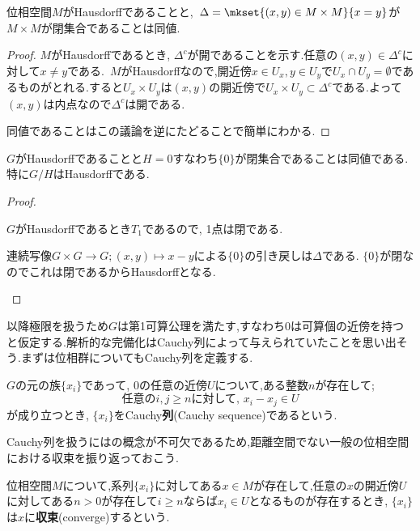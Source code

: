 \begin{prop}\label{prop:Hausdorffと対角線}
	位相空間$M$がHausdorffであることと,~$\Delta=\mkset{(x,y)\in M\times M}{x=y}$が$M\times M$が閉集合であることは同値.
\end{prop}
\begin{proof}
	$M$がHausdorffであるとき, $\Delta^c$が開であることを示す.任意の$(x,y)\in\Delta^c$に対して$x\neq y$である.~$M$がHausdorffなので,開近傍$x\in U_x,y\in U_y$で$U_x\cap U_y=\emptyset$であるものがとれる.すると$U_x\times U_y$は$(x,y)$の開近傍で$U_x\times U_y\subset\Delta^c$である.よって$(x,y)$は内点なので$\Delta^c$は開である.
	
	同値であることはこの議論を逆にたどることで簡単にわかる.
\end{proof}

\begin{prop}\label{prop:位相群がHdfになる条件}
	$G$がHausdorffであることと$H=0$すなわち$\{0\}$が閉集合であることは同値である.特に$G/H$はHausdorffである.
\end{prop}

\begin{proof}
	\begin{eqv}
		\item $G$がHausdorffであるとき$T_1$であるので, 1点は閉である.
		\item 連続写像$G\times G\to G;(x,y)\mapsto x-y$による$\{0\}$の引き戻しは$\Delta$である. $\{0\}$が閉なのでこれは閉であるからHausdorffとなる.
	\end{eqv}
\end{proof}

以降極限を扱うため$G$は第1可算公理を満たす,すなわち$0$は可算個の近傍を持つと仮定する.解析的な完備化はCauchy列によって与えられていたことを思い出そう.まずは位相群についてもCauchy列を定義する.

\begin{defi}[Cauchy列]
	$G$の元の族$\{x_i\}$であって, $0$の任意の近傍$U$について,ある整数$n$が存在して;
	\[\text{任意の}i,j\geq n\text{に対して, } x_i-x_j\in U\]
	が成り立つとき, $\{x_i\}$をCauchy\textbf{列}(Cauchy sequence)であるという.
\end{defi}

Cauchy列を扱うにはの概念が不可欠であるため,距離空間でない一般の位相空間における収束を振り返っておこう.

\begin{defi}[収束]
	位相空間$M$について,系列$\{x_i\}$に対してある$x\in M$が存在して,任意の$x$の開近傍$U$に対してある$n>0$が存在して$i\geq n$ならば$x_i\in U$となるものが存在するとき, $\{x_i\}$は$x$に\textbf{収束}(converge)するという.
\end{defi}

